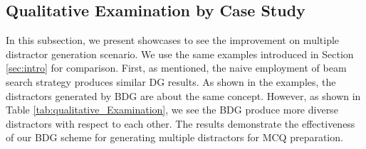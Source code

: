 \documentclass[11pt,a4paper]{article}
\begin{document}
\subsection{Qualitative Examination by Case Study}
In this subsection, we present showcases to see the improvement on multiple distractor generation scenario. We use the same examples introduced in Section \ref{sec:intro} for comparison. First, as mentioned, the naive employment of beam search strategy produces similar DG results. As shown in the examples, the distractors generated by BDG are about the same concept. However, as shown in Table \ref{tab:qualitative_Examination}, we see the BDG produce more diverse distractors with respect to each other. The results demonstrate the effectiveness of our BDG scheme for generating multiple distractors for MCQ preparation.
\end{document}
